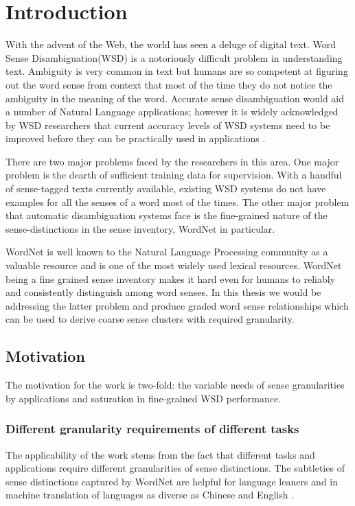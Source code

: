 \chapter{Introduction}
\label{chapter:introduction}
With the advent of the Web, the world has seen a deluge of digital text.  
Word Sense Disambiguation(WSD) is a notoriously difficult problem in understanding text. Ambiguity is very common in text but humans are so competent at figuring out the word sense from context that most of the time they do not notice the ambiguity in the meaning of the word. Accurate sense disambiguation would aid a number of Natural Language applications; however it is widely acknowledged by WSD researchers that current accuracy levels of WSD systems need to be improved before they can be practically used in applications \citep{ide2006making}.

There are two major problems faced by the researchers in this area. One major problem is the dearth of sufficient training data for supervision. With a handful of sense-tagged texts currently available, existing WSD systems do not have examples for all the senses of a word most of the times. The other major problem that automatic disambiguation systems face is the fine-grained nature of the sense-distinctions in the sense inventory, WordNet in particular. 

WordNet \citep{miller1995wordnet} \citep{fellbaum1998wordnet} is well known to the Natural Language Processing community as a valuable resource and is one of the most widely used lexical resources. WordNet being a fine grained sense inventory makes it hard even for humans to reliably and consistently distinguish among word senses. In this thesis we would be addressing the latter problem and produce graded word sense relationships which can be used to derive coarse sense clusters with required granularity.

\section{Motivation}
The motivation for the work is two-fold: the variable needs of sense granularities by applications and saturation in fine-grained WSD performance.

\subsection{Different granularity requirements of different tasks}
The applicability of the work stems from the fact that different tasks and applications require different granularities of sense distinctions. The subtleties of sense distinctions captured by WordNet are helpful for language leaners \citep{snow07mergesense} and in machine translation of languages as diverse as Chinese and English \citep{Ng:2003}. 

